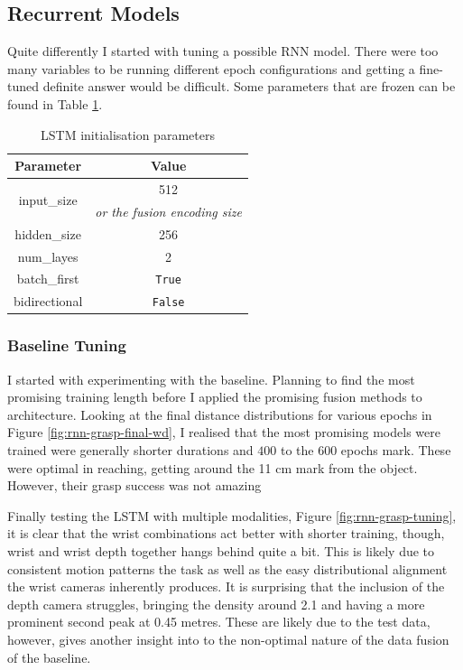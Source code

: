 \subsection{Recurrent Models}
Quite differently I started with tuning a possible RNN model. There were too many variables to be running different epoch configurations and getting a fine-tuned definite answer would be difficult. Some parameters that are frozen can be found in Table \ref{tab:rnn-params}.

\begin{table}[ht]
\centering
  \begin{tabular}{|| c | c ||}
  \hline
  Parameter & Value \\
  \hline
  \multirow{2}{*}{input\_size} & 512 \\
  & \emph{or the fusion encoding size} \\
  \hline
  hidden\_size & 256\\
  num\_layes & 2 \\
  batch\_first & \texttt{True} \\
  bidirectional & \texttt{False} \\
  \hline
  \end{tabular}\caption{LSTM initialisation parameters}\label{tab:rnn-params}
\end{table}

\subsubsection{Baseline Tuning}
I started with experimenting with the baseline. Planning to find the most promising training length before I applied the promising fusion methods to architecture. Looking at the final distance distributions for various epochs in Figure \ref{fig:rnn-grasp-final-wd}, I realised that the most promising models were trained were generally shorter durations and $400$ to the $600$ epochs mark. These were optimal in reaching, getting around the 11 cm mark from the object. However, their grasp success was not amazing 

Finally testing the LSTM with multiple modalities, Figure \ref{fig:rnn-grasp-tuning}, it is clear that the wrist combinations act better with shorter training, though, wrist and wrist depth together hangs behind quite a bit. This is likely due to consistent motion patterns the task as well as the easy distributional alignment the wrist cameras inherently produces. It is surprising that the inclusion of the depth camera struggles, bringing the density around 2.1 and having a more prominent second peak at 0.45 metres. These are likely due to the test data, however, gives another insight into to the non-optimal nature of the data fusion of the baseline.

